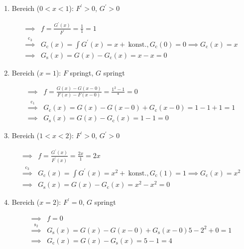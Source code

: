\begin{solution}
\begin{enumerate}[label = \arabic*.]
    \item Bereich ($0 < x < 1$):
    $F^\prime > 0$, $G^\prime > 0$

    \begin{align*}
        \implies & f = \frac{G^\prime(x)}{F^\prime} = \frac{1}{1} = 1 \\
        \stackrel{\mathrm c_3}{\implies} & G_\mathrm{c}(x) = \int G^\prime(x) = x + ~\text{konst.}, G_\mathrm{c}(0) = 0 \implies G_\mathrm{c}(x) = x \\
        \implies & G_\mathrm{s}(x) = G(x) - G_\mathrm{c}(x) = x - x = 0
    \end{align*}

    \item Bereich ($x = 1$):
    $F$ springt, $G$ springt

    \begin{align*}
        \implies & f = \frac{G(x) - G(x - 0)}{F(x) - F(x - 0)} = \frac{1^2 - 1}{\ast} = 0 \\
        \stackrel{\mathrm c_1}{\implies} & G_\mathrm{c}(x) = G(x) - G(x - 0) + G_\mathrm{c}(x - 0) = 1 - 1 + 1 = 1 \\
        \implies & G_\mathrm{s}(x) = G(x) - G_\mathrm{c}(x) = 1 - 1 = 0
    \end{align*}

    \item Bereich ($1 < x < 2$):
    $F^\prime > 0$, $G^\prime > 0$

    \begin{align*}
        \implies & f = \frac{G^\prime(x)}{F^\prime(x)} = \frac{2 x}{1} = 2 x \\
        \stackrel{\mathrm c_3}{\implies} & G_\mathrm{c}(x) = \int G^\prime(x) = x^2 + ~\text{konst.}, G_\mathrm{c}(1) = 1 \implies G_\mathrm{c}(x) = x^2 \\
        \implies & G_\mathrm{s}(x) = G(x) - G_\mathrm{c}(x) = x^2 - x^2 = 0
    \end{align*}

    \item Bereich ($x = 2$):
    $F^\prime = 0$, $G$ springt

    \begin{align*}
        \implies & f = 0 \\
        \stackrel{\mathrm s_2}{\implies} & G_\mathrm{s}(x) = G(x) - G(x - 0) + G_\mathrm{s}(x - 0) 5 - 2^2 + 0 = 1 \\
        \implies & G_\mathrm{c}(x) = G(x) - G_\mathrm{s}(x) = 5 - 1 = 4
    \end{align*}


\end{enumerate}
\end{solution}
